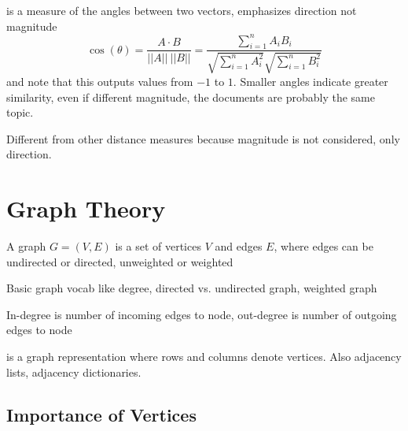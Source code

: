 \documentclass[12pt]{scrartcl}
\begin{document}
\begin{definition}
   is a measure of the angles between two vectors, emphasizes 
  direction not magnitude
  \[\cos(\theta) = \frac{A \cdot B}{||A|| \ ||B||}= \frac{\sum_{i=1}^n A_i B_i}{\sqrt{\sum_{i=1}^n A_i^2} \sqrt{\sum_{i=1}^n B_i^2}}\]
  and note that this outputs values from $-1$ to $1$. Smaller angles indicate greater 
  similarity, even if different magnitude, the documents are probably the same topic.
  
  Different from other distance measures because magnitude is not considered, only direction.
\end{definition}

\section{Graph Theory}

\begin{definition}
  A graph $G = (V, E)$ is a set of vertices $V$ and edges $E$, where edges can be 
  undirected or directed, unweighted or weighted
\end{definition}

\begin{definition}
  Basic graph vocab like degree, directed vs. undirected graph, weighted graph
  
  In-degree is number of incoming edges to node, out-degree is number of outgoing edges to node
\end{definition}

\begin{definition}
   is a graph representation where rows and columns denote vertices. 
  Also adjacency lists, adjacency dictionaries.
\end{definition}

\subsection{Importance of Vertices}
\end{document}
